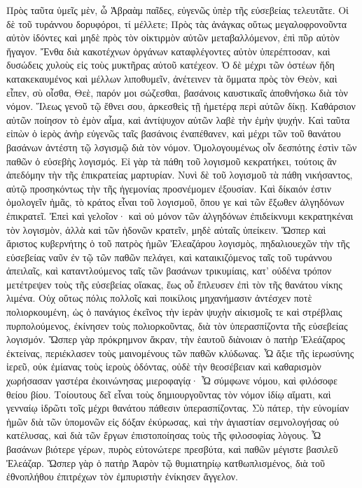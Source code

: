 Πρὸς ταῦτα ὑμεῖς μὲν, ὦ Ἁβραὰμ παῖδες, εὐγενῶς ὑπὲρ τῆς εὐσεβείας τελευτᾶτε. 
Οἱ δὲ τοῦ τυράννου δορυφόροι, τί μέλλετε; 
Πρὸς τὰς ἀνάγκας οὕτως μεγαλοφρονοῦντα αὐτὸν ἰδόντες καὶ μηδὲ πρὸς τὸν οἰκτιρμὸν αὐτῶν μεταβαλλόμενον, ἐπὶ πῦρ αὐτὸν ἤγαγον. 
Ἔνθα διὰ κακοτέχνων ὀργάνων καταφλέγοντες αὐτὸν ὑπερέπτοσαν, καὶ δυσώδεις χυλοὺς εἰς τοὺς μυκτῆρας αὐτοῦ κατέχεον. 
Ὁ δὲ μέχρι τῶν ὀστέων ἤδη κατακεκαυμένος καὶ μέλλων λιποθυμεῖν, ἀνέτεινεν τὰ ὄμματα πρὸς τὸν Θεὸν, καὶ εἶπεν, σὺ οἶσθα, Θεὲ, παρόν μοι σώζεσθαι, 
βασάνοις καυστικαῖς ἀποθνήσκω διὰ τὸν νόμον. 
Ἵλεως γενοῦ τῷ ἔθνει σου, ἀρκεσθεὶς τῇ ἡμετέρᾳ περὶ αὐτῶν δίκῃ. 
Καθάρσιον αὐτῶν ποίησον τὸ ἐμὸν αἷμα, καὶ ἀντίψυχον αὐτῶν λαβὲ τὴν ἐμὴν ψυχήν. 
Καὶ ταῦτα εἰπὼν ὁ ἱερὸς ἀνὴρ εὐγενῶς ταῖς βασάνοις ἐναπέθανεν, καὶ μέχρι τῶν τοῦ θανάτου βασάνων ἀντέστη τῷ λσγισμῷ διὰ τὸν νόμον. 
Ὁμολογουμένως οἶν δεσπότης ἐστὶν τῶν παθῶν ὁ εὐσεβὴς λογισμός. 
Εἰ γὰρ τὰ πάθη τοῦ λογισμοῦ κεκρατήκει, τούτοις ἂν ἀπεδόμην τὴν τῆς ἐπικρατείας μαρτυρίαν. 
Νυνὶ δὲ τοῦ λογισμοῦ τὰ πάθη νικήσαντος, αὐτῷ προσηκόντως τὴν τῆς ἡγεμονίας προσνέμομεν ἐξουσίαν. 
Καὶ δίκαιόν ἐστιν ὁμολογεῖν ἡμᾶς, τὸ κράτος εἶναι τοῦ λογισμοῦ, ὅπου γε καὶ τῶν ἔξωθεν ἀλγηδόνων ἐπικρατεῖ. 
Ἐπεὶ καὶ γελοῖον· καὶ οὐ μόνον τῶν ἀλγηδόνων ἐπιδείκνυμι κεκρατηκέναι τὸν λογισμὸν, ἀλλὰ καὶ τῶν ἡδονῶν κρατεῖν, μηδὲ αὐταῖς ὑπείκειν. 
Ὥσπερ καὶ ἄριστος κυβερνήτης ὁ τοῦ πατρὸς ἡμῶν Ἐλεαζάρου λογισμὸς, πηδαλιουεχῶν τὴν τῆς εὐσεβείας ναῦν ἐν τῷ τῶν παθῶν πελάγει, 
καὶ καταικιζόμενος ταῖς τοῦ τυράννου ἀπειλαῖς, καὶ καταντλούμενος ταῖς τῶν βασάνων τρικυμίαις, 
κατ' οὐδένα τρόπον μετέτρεψεν τοὺς τῆς εὐσεβείας οἴακας, ἕως οὗ ἔπλευσεν ἐπὶ τὸν τῆς θανάτου νίκης λιμένα. 
Οὐχ οὕτως πόλις πολλοῖς καὶ ποικίλοις μηχανήμασιν ἀντέσχεν ποτὲ πολιορκουμένη, ὡς ὁ πανάγιος ἐκεῖνος τὴν ἱερὰν ψυχὴν αἰκισμοῖς τε καὶ στρέβλαις πυρπολούμενος, ἐκίνησεν τοὺς πολιορκοῦντας, διὰ τὸν ὑπερασπίζοντα τῆς εὐσεβείας λογισμόν. 
Ὥσπερ γὰρ πρόκρημνον ἄκραν, τὴν ἑαυτοῦ διὰνοιαν ὁ πατὴρ Ἐλεάζαρος ἐκτείνας, περιέκλασεν τοὺς μαινομένους τῶν παθῶν κλύδωνας. 
Ὦ ἄξιε τῆς ἱερωσύνης ἱερεῦ, οὐκ ἐμίανας τοὺς ἱεροὺς ὀδόντας, οὐδὲ τὴν θεοσέβειαν καὶ καθαρισμὸν χωρήσασαν γαστέρα ἐκοινώνησας μιεροφαγίᾳ· 
Ὦ σύμφωνε νόμου, καὶ φιλόσοφε θείου βίου. 
Τοίουτους δεῖ εἶναι τοὺς δημιουργοῦντας τὸν νόμον ἰδίῳ αἵματι, καὶ γενναίῳ ἱδρῶτι τοῖς μέχρι θανάτου πάθεσιν ὑπερασπίζοντας. 
Σὺ πάτερ, τὴν εὐνομίαν ἡμῶν διὰ τῶν ὑπομονῶν εἰς δόξαν ἐκύρωσας, καὶ τὴν ἁγιαστίαν σεμνολογήσας οὐ κατέλυσας, καὶ διὰ τῶν ἔργων ἐπιστοποίησας τοὺς τῆς φιλοσοφίας λὸγους. 
Ὦ βασάνων βιότερε γέρων, πυρὸς εὐτονώτερε πρεσβύτα, καὶ παθῶν μέγιστε βασιλεῦ Ἐλεάζαρ. 
Ὥσπερ γὰρ ὁ πατὴρ Ἀαρὸν τῷ θυμιατηρίῳ κατθωπλισμένος, διὰ τοῦ ἐθνοπλήθου ἐπιτρέχων τὸν ἐμπυριστὴν ἐνίκησεν ἄγγελον. 
